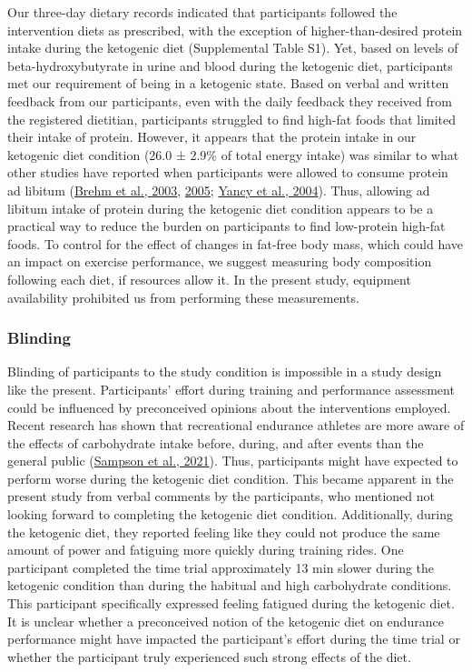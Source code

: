 \documentclass[]{cik}%
\begin{document}
Our three-day dietary records indicated that participants followed the
intervention diets as prescribed, with the exception of
higher-than-desired protein intake during the ketogenic diet
(Supplemental Table S1). Yet, based on levels of beta-hydroxybutyrate in
urine and blood during the ketogenic diet, participants met our
requirement of being in a ketogenic state. Based on verbal and written
feedback from our participants, even with the daily feedback they
received from the registered dietitian, participants struggled to find
high-fat foods that limited their intake of protein. However, it appears
that the protein intake in our ketogenic diet condition (26.0 ± 2.9\% of
total energy intake) was similar to what other studies have reported
when participants were allowed to consume protein ad libitum
(\protect\hyperlink{ref-55}{Brehm et al., 2003},
\protect\hyperlink{ref-56}{2005}; \protect\hyperlink{ref-57}{Yancy et
al., 2004}). Thus, allowing ad libitum intake of protein during the
ketogenic diet condition appears to be a practical way to reduce the
burden on participants to find low-protein high-fat foods. To control
for the effect of changes in fat-free body mass, which could have an
impact on exercise performance, we suggest measuring body composition
following each diet, if resources allow it. In the present study,
equipment availability prohibited us from performing these measurements.

\hypertarget{blinding}{%
\subsubsection{Blinding}\label{blinding}}

Blinding of participants to the study condition is impossible in a study
design like the present. Participants' effort during training and
performance assessment could be influenced by preconceived opinions
about the interventions employed. Recent research has shown that
recreational endurance athletes are more aware of the effects of
carbohydrate intake before, during, and after events than the general
public (\protect\hyperlink{ref-59}{Sampson et al., 2021}). Thus,
participants might have expected to perform worse during the ketogenic
diet condition. This became apparent in the present study from verbal
comments by the participants, who mentioned not looking forward to
completing the ketogenic diet condition. Additionally, during the
ketogenic diet, they reported feeling like they could not produce the
same amount of power and fatiguing more quickly during training rides.
One participant completed the time trial approximately 13 min slower
during the ketogenic condition than during the habitual and high
carbohydrate conditions. This participant specifically expressed feeling
fatigued during the ketogenic diet. It is unclear whether a preconceived
notion of the ketogenic diet on endurance performance might have
impacted the participant's effort during the time trial or whether the
participant truly experienced such strong effects of the diet.
\end{document}
